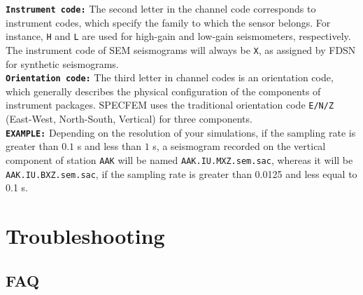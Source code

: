 \documentclass[oneside,english]{book}
\begin{document}
\noindent \textbf{\texttt{Instrument code:}} The second letter in the channel code corresponds to instrument codes, which specify the family to which the sensor belongs. For instance, \texttt{H} and \texttt{L} are used for high-gain and low-gain seismometers, respectively. The instrument code of SEM seismograms will always be \texttt{X}, as assigned by FDSN for synthetic seismograms. \\

\noindent \textbf{\texttt{Orientation code:}} The third letter in channel codes is an orientation code, which generally describes the physical configuration of the components of instrument packages. SPECFEM uses the traditional orientation code  \texttt{E/N/Z} (East-West, North-South, Vertical) for three components. \\

\noindent \textbf{\texttt{EXAMPLE:}} Depending on the resolution of your simulations, if the sampling rate is greater than $0.1$ s and less than $1$ s, a seismogram recorded on the vertical component of station \texttt{AAK} will be named \texttt{AAK.IU.MXZ.sem.sac}, whereas it will be \texttt{AAK.IU.BXZ.sem.sac}, if the sampling rate is greater than 0.0125 and less equal to 0.1 s.



\chapter{\label{cha:Troubleshooting}Troubleshooting}

\section*{FAQ}
\end{document}
